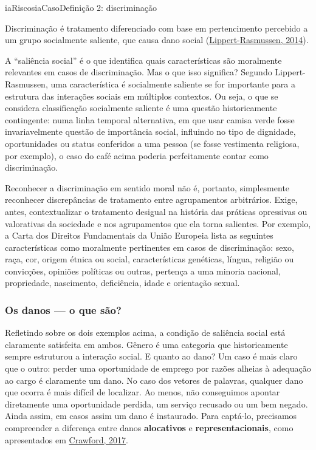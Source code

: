 \documentclass[
  11pt,
]{article}
\newenvironment{definicao}[1][Definicao]{\begin{iabox}{iaRiscos}{iaCaso}{#1}}{\end{iabox}}
\begin{document}
\begin{definicao}[Definição 2: discriminação]

Discriminação é tratamento diferenciado com base em pertencimento
percebido a um grupo socialmente saliente, que causa dano social
(\href{https://oxford.universitypressscholarship.com/view/10.1093/acprof:oso/9780199796113.001.0001/acprof-9780199796113}{Lippert-Rasmussen,
2014}).

\end{definicao}

A ``saliência social'' é o que identifica quais características são
moralmente relevantes em casos de discriminação. Mas o que isso
significa? Segundo Lippert-Rasmussen, uma característica é socialmente
saliente se for importante para a estrutura das interações sociais em
múltiplos contextos. Ou seja, o que se considera classificação
socialmente saliente é uma questão historicamente contingente: numa
linha temporal alternativa, em que usar camisa verde fosse
invariavelmente questão de importância social, influindo no tipo de
dignidade, oportunidades ou status conferidos a uma pessoa (se fosse
vestimenta religiosa, por exemplo), o caso do café acima poderia
perfeitamente contar como discriminação.

Reconhecer a discriminação em sentido moral não é, portanto,
simplesmente reconhecer discrepâncias de tratamento entre agrupamentos
arbitrários. Exige, antes, contextualizar o tratamento desigual na
história das práticas opressivas ou valorativas da sociedade e nos
agrupamentos que ela torna salientes. Por exemplo, a Carta dos Direitos
Fundamentais da União Europeia lista as seguintes características como
moralmente pertinentes em casos de discriminação: sexo, raça, cor,
origem étnica ou social, características genéticas, língua, religião ou
convicções, opiniões políticas ou outras, pertença a uma minoria
nacional, propriedade, nascimento, deficiência, idade e orientação
sexual.

\subsubsection{Os danos --- o que são?}\label{os-danos-o-que-suxe3o}

Refletindo sobre os dois exemplos acima, a condição de saliência social
está claramente satisfeita em ambos. Gênero é uma categoria que
historicamente sempre estruturou a interação social. E quanto ao dano?
Um caso é mais claro que o outro: perder uma oportunidade de emprego por
razões alheias à adequação ao cargo é claramente um dano. No caso dos
vetores de palavras, qualquer dano que ocorra é mais difícil de
localizar. Ao menos, não conseguimos apontar diretamente uma
oportunidade perdida, um serviço recusado ou um bem negado. Ainda assim,
em casos assim um dano é instaurado. Para captá-lo, precisamos
compreender a diferença entre danos \textbf{alocativos} e
\textbf{representacionais}, como apresentados em
\href{https://www.youtube.com/watch?v=fMym_BKWQzk}{Crawford, 2017}.
\end{document}
